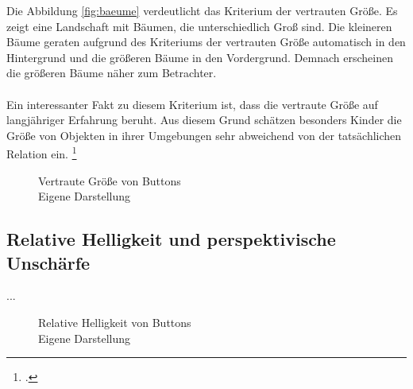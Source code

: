 Die Abbildung \ref{fig:baeume} verdeutlicht das Kriterium der vertrauten Größe. Es zeigt eine Landschaft mit Bäumen, die unterschiedlich Groß sind. Die kleineren Bäume geraten aufgrund des Kriteriums der vertrauten Größe automatisch in den Hintergrund und die größeren Bäume in den Vordergrund. Demnach erscheinen die größeren Bäume näher zum Betrachter.\\
\\
Ein interessanter Fakt zu diesem Kriterium ist, dass die vertraute Größe auf langjähriger Erfahrung beruht. Aus diesem Grund schätzen besonders Kinder die Größe von Objekten in ihrer Umgebungen sehr abweichend von der tatsächlichen Relation ein. \footcite[Vgl.]{Helm1867}
\begin{figure}[!ht]
\centering
{}
\caption[Vertraute Größe von Buttons	]{Vertraute Größe von Buttons\\ Eigene Darstellung}
\label{sample_vertraute_groesse}
\end{figure}

\subsection{Relative Helligkeit und perspektivische Unschärfe}
...
\begin{figure}[!ht]
\centering
{}
\caption[Relative Helligkeit von Buttons]{Relative Helligkeit von Buttons\\ Eigene Darstellung}
\label{sample_relative_helligkeit}
\end{figure}


